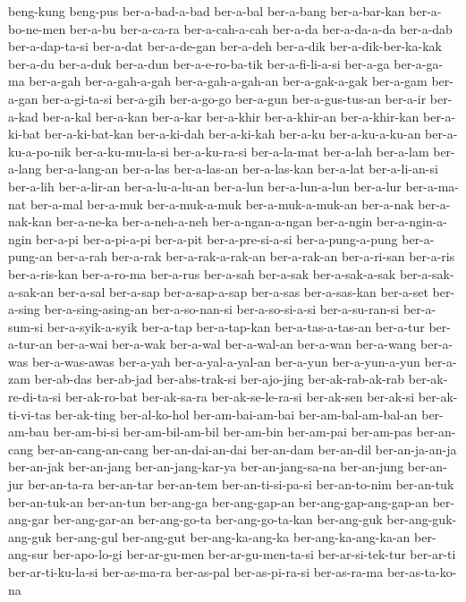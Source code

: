 {beng-kung beng-pus ber-a-bad-a-bad ber-a-bal ber-a-bang ber-a-bar-kan
ber-a-bo-ne-men ber-a-bu ber-a-ca-ra ber-a-cah-a-cah ber-a-da
ber-a-da-a-da ber-a-dab ber-a-dap-ta-si ber-a-dat ber-a-de-gan ber-a-deh
ber-a-dik ber-a-dik-ber-ka-kak ber-a-du ber-a-duk ber-a-dun
ber-a-e-ro-ba-tik ber-a-fi-li-a-si ber-a-ga ber-a-ga-ma ber-a-gah
ber-a-gah-a-gah ber-a-gah-a-gah-an ber-a-gak-a-gak ber-a-gam ber-a-gan
ber-a-gi-ta-si ber-a-gih ber-a-go-go ber-a-gun ber-a-gus-tus-an ber-a-ir
ber-a-kad ber-a-kal ber-a-kan ber-a-kar ber-a-khir ber-a-khir-an
ber-a-khir-kan ber-a-ki-bat ber-a-ki-bat-kan ber-a-ki-dah ber-a-ki-kah
ber-a-ku ber-a-ku-a-ku-an ber-a-ku-a-po-nik ber-a-ku-mu-la-si
ber-a-ku-ra-si ber-a-la-mat ber-a-lah ber-a-lam ber-a-lang ber-a-lang-an
ber-a-las ber-a-las-an ber-a-las-kan ber-a-lat ber-a-li-an-si ber-a-lih
ber-a-lir-an ber-a-lu-a-lu-an ber-a-lun ber-a-lun-a-lun ber-a-lur
ber-a-ma-nat ber-a-mal ber-a-muk ber-a-muk-a-muk ber-a-muk-a-muk-an
ber-a-nak ber-a-nak-kan ber-a-ne-ka ber-a-neh-a-neh ber-a-ngan-a-ngan
ber-a-ngin ber-a-ngin-a-ngin ber-a-pi ber-a-pi-a-pi ber-a-pit
ber-a-pre-si-a-si ber-a-pung-a-pung ber-a-pung-an ber-a-rah ber-a-rak
ber-a-rak-a-rak-an ber-a-rak-an ber-a-ri-san ber-a-ris ber-a-ris-kan
ber-a-ro-ma ber-a-rus ber-a-sah ber-a-sak ber-a-sak-a-sak
ber-a-sak-a-sak-an ber-a-sal ber-a-sap ber-a-sap-a-sap ber-a-sas
ber-a-sas-kan ber-a-set ber-a-sing ber-a-sing-asing-an ber-a-so-nan-si
ber-a-so-si-a-si ber-a-su-ran-si ber-a-sum-si ber-a-syik-a-syik ber-a-tap
ber-a-tap-kan ber-a-tas-a-tas-an ber-a-tur ber-a-tur-an ber-a-wai
ber-a-wak ber-a-wal ber-a-wal-an ber-a-wan ber-a-wang ber-a-was
ber-a-was-awas ber-a-yah ber-a-yal-a-yal-an ber-a-yun ber-a-yun-a-yun
ber-a-zam ber-ab-das ber-ab-jad ber-abs-trak-si ber-ajo-jing
ber-ak-rab-ak-rab ber-ak-re-di-ta-si ber-ak-ro-bat ber-ak-sa-ra
ber-ak-se-le-ra-si ber-ak-sen ber-ak-si ber-ak-ti-vi-tas ber-ak-ting
ber-al-ko-hol ber-am-bai-am-bai ber-am-bal-am-bal-an ber-am-bau
ber-am-bi-si ber-am-bil-am-bil ber-am-bin ber-am-pai ber-am-pas
ber-an-cang ber-an-cang-an-cang ber-an-dai-an-dai ber-an-dam ber-an-dil
ber-an-ja-an-ja ber-an-jak ber-an-jang ber-an-jang-kar-ya
ber-an-jang-sa-na ber-an-jung ber-an-jur ber-an-ta-ra ber-an-tar
ber-an-tem ber-an-ti-si-pa-si ber-an-to-nim ber-an-tuk ber-an-tuk-an
ber-an-tun ber-ang-ga ber-ang-gap-an ber-ang-gap-ang-gap-an ber-ang-gar
ber-ang-gar-an ber-ang-go-ta ber-ang-go-ta-kan ber-ang-guk
ber-ang-guk-ang-guk ber-ang-gul ber-ang-gut ber-ang-ka-ang-ka
ber-ang-ka-ang-ka-an ber-ang-sur ber-apo-lo-gi ber-ar-gu-men
ber-ar-gu-men-ta-si ber-ar-si-tek-tur ber-ar-ti ber-ar-ti-ku-la-si
ber-as-ma-ra ber-as-pal ber-as-pi-ra-si ber-as-ra-ma ber-as-ta-ko-na
}
